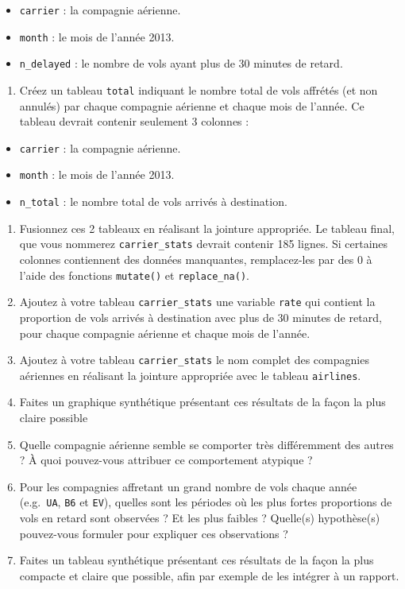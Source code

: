 \documentclass[a4paperpaper,]{article}
\providecommand{\tightlist}{%
  \setlength{\itemsep}{0pt}\setlength{\parskip}{0pt}}
\begin{document}
\begin{itemize}
\tightlist
\item
  \texttt{carrier} : la compagnie aérienne.
\item
  \texttt{month} : le mois de l'année 2013.
\item
  \texttt{n\_delayed} : le nombre de vols ayant plus de 30 minutes de retard.
\end{itemize}

\begin{enumerate}
\def\labelenumi{\arabic{enumi}.}
\setcounter{enumi}{1}
\tightlist
\item
  Créez un tableau \texttt{total} indiquant le nombre total de vols affrétés (et non annulés) par chaque compagnie aérienne et chaque mois de l'année. Ce tableau devrait contenir seulement 3 colonnes :
\end{enumerate}

\begin{itemize}
\tightlist
\item
  \texttt{carrier} : la compagnie aérienne.
\item
  \texttt{month} : le mois de l'année 2013.
\item
  \texttt{n\_total} : le nombre total de vols arrivés à destination.
\end{itemize}

\begin{enumerate}
\def\labelenumi{\arabic{enumi}.}
\setcounter{enumi}{2}
\item
  Fusionnez ces 2 tableaux en réalisant la jointure appropriée. Le tableau final, que vous nommerez \texttt{carrier\_stats} devrait contenir 185 lignes. Si certaines colonnes contiennent des données manquantes, remplacez-les par des 0 à l'aide des fonctions \texttt{mutate()} et \texttt{replace\_na()}.
\item
  Ajoutez à votre tableau \texttt{carrier\_stats} une variable \texttt{rate} qui contient la proportion de vols arrivés à destination avec plus de 30 minutes de retard, pour chaque compagnie aérienne et chaque mois de l'année.
\item
  Ajoutez à votre tableau \texttt{carrier\_stats} le nom complet des compagnies aériennes en réalisant la jointure appropriée avec le tableau \texttt{airlines}.
\item
  Faites un graphique synthétique présentant ces résultats de la façon la plus claire possible
\item
  Quelle compagnie aérienne semble se comporter très différemment des autres ? À quoi pouvez-vous attribuer ce comportement atypique ?
\item
  Pour les compagnies affretant un grand nombre de vols chaque année (e.g.~\texttt{UA}, \texttt{B6} et \texttt{EV}), quelles sont les périodes où les plus fortes proportions de vols en retard sont observées ? Et les plus faibles ? Quelle(s) hypothèse(s) pouvez-vous formuler pour expliquer ces observations ?
\item
  Faites un tableau synthétique présentant ces résultats de la façon la plus compacte et claire que possible, afin par exemple de les intégrer à un rapport.
\end{enumerate}
\end{document}

